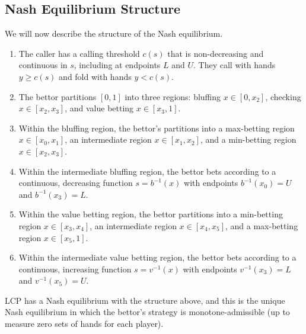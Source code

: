 \documentclass[../../main/main.tex]{subfiles}
\begin{document}
\subsection{Nash Equilibrium Structure}


We will now describe the structure of the Nash equilibrium.

    \begin{enumerate}
        \item The caller has a calling threshold $c(s)$ that is non-decreasing and continuous in $s$, including at endpoints $L$ and $U$. They call with hands $y \geq c(s)$ and fold with hands $y < c(s)$.
        \item The bettor partitions $[0,1]$ into three regions: bluffing $x \in [0,x_2]$, checking $x \in [x_2,x_3]$, and value betting $x \in [x_3,1]$.
        \item Within the bluffing region, the bettor's partitions into a max-betting region $x \in [x_0,x_1]$, an intermediate region $x \in [x_1,x_2]$, and a min-betting region $x \in [x_2,x_3]$.
        \item Within the intermediate bluffing region, the bettor bets according to a continuous, decreasing function $s=b^{-1}(x)$ with endpoints $b^{-1}(x_0)=U$ and $b^{-1}(x_3)=L$.
        \item Within the value betting region, the bettor partitions into a min-betting region $x \in [x_3,x_4]$, an intermediate region $x \in [x_4,x_5]$, and a max-betting region $x \in [x_5,1]$.
        \item Within the intermediate value betting region, the bettor bets according to a continuous, increasing function $s=v^{-1}(x)$ with endpoints $v^{-1}(x_3)=L$ and $v^{-1}(x_5)=U$.
    \end{enumerate}

\begin{theorem}
    \label{thm:nash_equilibrium_structure}
    LCP has a Nash equilibrium with the structure above, and this is the unique Nash equilibrium in which the bettor's strategy is monotone-admissible (up to measure zero sets of hands for each player).
\end{theorem}

\end{document}
